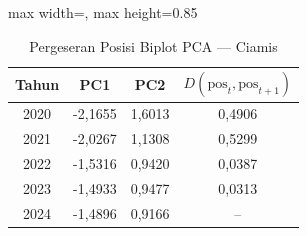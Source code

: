 \begin{table}[H]
\centering
\caption{Pergeseran Posisi Biplot PCA --- Ciamis} \label{tab:appjarak_pca_skor_ciamis}
\begin{adjustbox}{max width=\textwidth, max height=0.85\textheight}
\begin{tabular}{|c|c|c|c|}
\hline
\textbf{Tahun} & \textbf{PC1} & \textbf{PC2} & \textbf{$D(\text{pos}_t, \text{pos}_{t+1})$} \\
\hline
2020 & -2,1655 & 1,6013 & 0,4906 \\
2021 & -2,0267 & 1,1308 & 0,5299 \\
2022 & -1,5316 & 0,9420 & 0,0387 \\
2023 & -1,4933 & 0,9477 & 0,0313 \\
2024 & -1,4896 & 0,9166 & -- \\
\hline
\end{tabular}
\end{adjustbox}
\end{table}